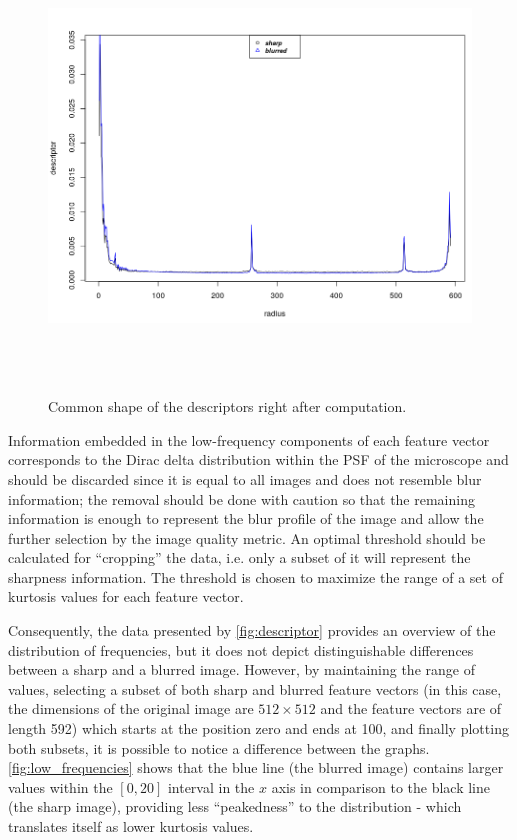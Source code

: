 \begin{figure}[htb]
	\centering
	\caption{Common shape of the descriptors right after computation.}
	\label{fig:descriptor}
	\includegraphics[width=\textwidth, height=12cm, trim = 0cm 0cm 0cm 0.3cm, clip]{images/descriptor.png}
	\centering
	\fautor
\end{figure}

Information embedded in the low-frequency components of each feature vector corresponds to the Dirac delta distribution within the PSF of the microscope and should be discarded since it is equal to all images and does not resemble blur information; the removal should be done with caution so that the remaining information is enough to represent the blur profile of the image and allow the further selection by the image quality metric. An optimal threshold should be calculated for ``cropping'' the data, i.e. only a subset of it will represent the sharpness information. The threshold is chosen to maximize the range of a set of kurtosis values for each feature vector.

Consequently, the data presented by \autoref{fig:descriptor} provides an overview of the distribution of frequencies, but it does not depict distinguishable differences between a sharp and a blurred image. However, by maintaining the range of values, selecting a subset of both sharp and blurred feature vectors (in this case, the dimensions of the original image are $512 \times 512$ and the feature vectors are of length 592) which starts at the position zero and ends at 100, and finally plotting both subsets, it is possible to notice a difference between the graphs. \autoref{fig:low_frequencies} shows that the blue line (the blurred image) contains larger values within the $[0,20]$ interval in the $x$ axis in comparison to the black line (the sharp image), providing less 
``peakedness''  to the distribution - which translates itself as lower kurtosis values.

